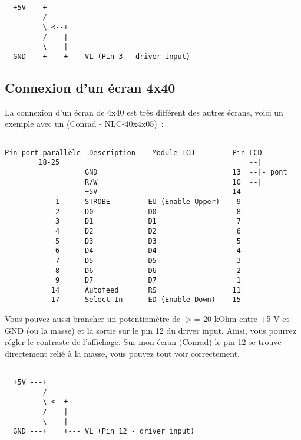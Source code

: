 \begin{example}
\begin{verbatim}
  
  +5V ---+
         /
         \ <--+
         /    |
         \    |
  GND ---+    +--- VL (Pin 3 - driver input)
\end{verbatim}
\end{example}



\subsection{Connexion d'un écran 4x40}

   La connexion d'un écran de 4x40 est très différent des autres écrans, 
  voici un exemple avec un (Conrad - NLC-40x4x05)~:

\begin{example}
\begin{verbatim}

Pin port parallèle  Description    Module LCD         Pin LCD
        18-25                                             --|
                   GND                                13  --|- pont
                   R/W                                10  --|
                   +5V                                14
            1      STROBE         EU (Enable-Upper)    9
            2      D0             D0                   8
            3      D1             D1                   7
            4      D2             D2                   6
            5      D3             D3                   5
            6      D4             D4                   4
            7      D5             D5                   3
            8      D6             D6                   2
            9      D7             D7                   1
           14      Autofeed       RS                  11
           17      Select In      ED (Enable-Down)    15
\end{verbatim}
\end{example}
 
     Vous pouvez aussi brancher un potentiomètre de $>$= 20 kOhm entre +5 V et GND
	(ou la masse) et la sortie sur le pin 12 du driver input. Ainsi, vous pourrez
	régler le contraste de l'affichage. Sur mon écran (Conrad) le pin 12 se trouve
	directement relié à la masse, vous pouvez tout voir correctement.

\begin{example}
\begin{verbatim}

  +5V ---+
         /
         \ <--+
         /    |
         \    |
  GND ---+    +--- VL (Pin 12 - driver input)
\end{verbatim}
\end{example}



